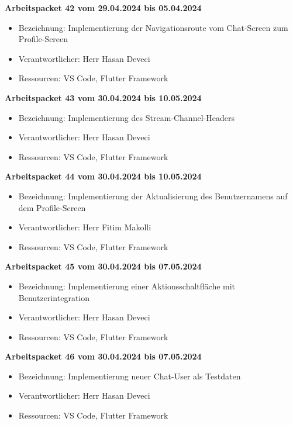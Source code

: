 \textbf{Arbeitspacket 42 vom 29.04.2024 bis 05.04.2024}
\begin{itemize}[itemsep=0pt]
	\item{Bezeichnung: Implementierung der Navigationsroute vom Chat-Screen zum Profile-Screen}
	\item{Verantwortlicher: Herr Hasan Deveci} 
	\item{Ressourcen: VS Code, Flutter Framework} 
\end{itemize} 

\textbf{Arbeitspacket 43 vom 30.04.2024 bis 10.05.2024}
\begin{itemize}[itemsep=0pt]
	\item{Bezeichnung: Implementierung des Stream-Channel-Headers}
	\item{Verantwortlicher: Herr Hasan Deveci} 
	\item{Ressourcen: VS Code, Flutter Framework} 
\end{itemize} 

\textbf{Arbeitspacket 44 vom 30.04.2024 bis 10.05.2024}
\begin{itemize}[itemsep=0pt]
	\item{Bezeichnung: Implementierung der Aktualisierung des Benutzernamens auf dem Profile-Screen}
	\item{Verantwortlicher: Herr Fitim Makolli} 
	\item{Ressourcen: VS Code, Flutter Framework} 
\end{itemize} 

\textbf{Arbeitspacket 45 vom 30.04.2024 bis 07.05.2024}
\begin{itemize}[itemsep=0pt]
	\item{Bezeichnung: Implementierung einer Aktionsschaltfläche mit Benutzerintegration}
	\item{Verantwortlicher: Herr Hasan Deveci} 
	\item{Ressourcen: VS Code, Flutter Framework} 
\end{itemize} 

\textbf{Arbeitspacket 46 vom 30.04.2024 bis 07.05.2024}
\begin{itemize}[itemsep=0pt]
	\item{Bezeichnung: Implementierung neuer Chat-User als Testdaten}
	\item{Verantwortlicher: Herr Hasan Deveci} 
	\item{Ressourcen: VS Code, Flutter Framework} 
\end{itemize} 
